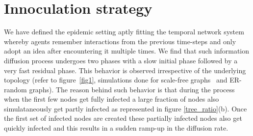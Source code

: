 \noindent

\section{Innoculation strategy}

%  


We have defined the epidemic setting aptly fitting the temporal network system whereby agents remember
interactions from the previous time-steps and only adopt an idea after encountering it multiple times. 
We find that such information diffusion process undergoes two phases with a slow initial phase followed by a very fast residual phase. This behavior is observed 
irrespective of the underlying topology (refer to figure~\ref{fig1}, simulations done for scale-free graphs~\cite{barabasi1999emergence} and ER-random graphs).
 The reason behind such behavior is that during the process when the first few nodes get fully infected a large fraction of nodes also simulataneously get partly infected as 
represented in figure \ref{tree_ratio}(b). Once the first set of infected nodes are created these partially infected nodes also get quickly infected and this 
results in a sudden ramp-up in the diffusion rate.

